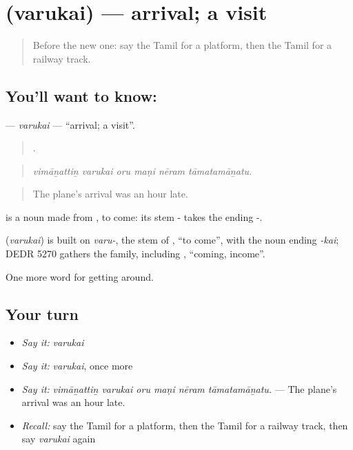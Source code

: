\section[\texorpdfstring{\ta{வருகை} (varukai)}{வருகை (varukai)}]{ (varukai) — arrival; a visit}

\label{lesson:TA-C400-varukai}



\begin{quote}
Before the new one: say the Tamil for a platform, then the Tamil for a railway track.
\end{quote}

\subsection*{You'll want to know: }
\textbf{} — \emph{varukai} — \textquotedblleft{}arrival; a visit\textquotedblright{}.

\begin{quote}
     .
\end{quote}

\begin{quote}
\emph{vimāṉattiṉ varukai oru maṇi nēram tāmatamāṉatu.}
\end{quote}

\begin{quote}
The plane's arrival was an hour late.
\end{quote}

 is a noun made from , to come: its stem - takes the ending -.

\begin{cousinweb}
\textbf{} (\emph{varukai}) is built on \emph{varu-}, the stem of , \textquotedblleft{}to come\textquotedblright{}, with the noun ending \emph{-kai}; DEDR 5270 gathers the family, including , \textquotedblleft{}coming, income\textquotedblright{}.
\end{cousinweb}

\begin{grammarlens}[title={What you've built}]
One more word for getting around.
\end{grammarlens}

\subsection*{Your turn}
\begin{itemize}
\raggedright
  \item \emph{Say it:} \emph{varukai}
  \item \emph{Say it:} \emph{varukai}, once more
  \item \emph{Say it:} \emph{vimāṉattiṉ varukai oru maṇi nēram tāmatamāṉatu.} — The plane's arrival was an hour late.
  \item \emph{Recall:} say the Tamil for a platform, then the Tamil for a railway track, then say \emph{varukai} again
\end{itemize}

